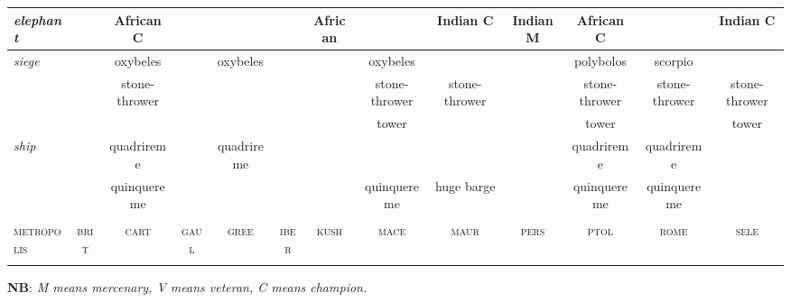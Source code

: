 \documentclass{article}
\newcommand{\brit}{\textsc{\color{blue} brit}}
\newcommand{\cart}{\textsc{\color{blue} cart}}
\newcommand{\gaul}{\textsc{\color{blue} gaul}}
\newcommand{\gree}{\textsc{\color{blue} gree}}
\newcommand{\iber}{\textsc{\color{blue} iber}}
\newcommand{\kush}{\textsc{\color{blue} kush}}
\newcommand{\mace}{\textsc{\color{blue} mace}}
\newcommand{\maur}{\textsc{\color{blue} maur}}
\newcommand{\pers}{\textsc{\color{blue} pers}}
\newcommand{\ptol}{\textsc{\color{blue} ptol}}
\newcommand{\rome}{\textsc{\color{blue} rome}}
\newcommand{\sele}{\textsc{\color{blue} sele}}
\newcommand{\metropolis}{\textsc{\color{blue} metropolis}}
\begin{document}
\begin{landscape}
\begin{tabular}{l||c|c|c|c||c|c|c|c||c|c|c|c}
\hline\textit{elephant}
 &                & African C      &                &                &                & African        &                & Indian C       & Indian M       & African C      &                & Indian C       \\
\hline\textit{siege}
 &                & oxybeles       &                & oxybeles       &                &                & oxybeles       &                &                & polybolos      & scorpio        &                \\
 &                & stone-thrower  &                &                &                &                & stone-thrower  & stone-thrower  &                & stone-thrower  & stone-thrower  & stone-thrower  \\
 &                &                &                &                &                &                & tower          &                &                & tower          &                & tower          \\
\hline\textit{ship}
 &                & quadrireme     &                & quadrireme     &                &                &                &                &                & quadrireme     & quadrireme     &                \\
 &                & quinquereme    &                &                &                &                & quinquereme    & huge barge     &                & quinquereme    & quinquereme    &                \\

\hline
\hline
 &                &                &                &                &                &                &                &                &                &                &                &                \\
\metropolis %
 & \brit          & \cart          & \gaul          & \gree          & \iber          & \kush          & \mace          & \maur          & \pers          & \ptol          & \rome          & \sele          \\
 &                &                &                &                &                &                &                &                &                &                &                &                \\
\hline
\hline
\end{tabular}

\textbf{NB}: \emph{\emph{M} means mercenary, \emph{V} means veteran, \emph{C} means champion.}\\
\end{landscape}
\end{document}

